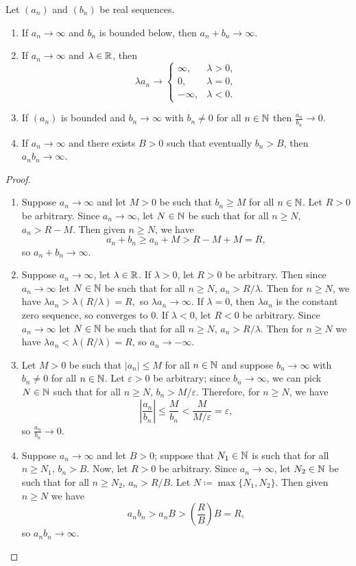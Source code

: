 \documentclass[../analysis1.tex]{subfiles}
\begin{document}
\begin{theorem}
\label{thm:divergenceresults1234}
    \begin{shaded*}
        Let $(a_n)$ and $(b_n)$ be real sequences.
        \begin{enumerate}
            \item[1.] If $a_n\to\infty$ and $b_n$ is bounded below, then $a_n+b_n\to\infty$.
            \item[2.] If $a_n\to\infty$ and $\lambda\in\mathbb{R}$, then $$\lambda a_n\to\begin{cases}\infty, & \lambda>0,\\ 0, & \lambda=0,\\ -\infty, & \lambda<0. \end{cases}$$
            \item[3.] If $(a_n)$ is bounded and $b_n\to\infty$ with $b_n\ne 0$ for all $n\in\mathbb{N}$ then $\frac{a_n}{b_n}\to 0$.
            \item[4.] If $a_n\to\infty$ and there exists $B>0$ such that eventually $b_n>B$, then $a_nb_n\to\infty$. 
        \end{enumerate}
    \end{shaded*}
\end{theorem}
\begin{proof}
    \begin{enumerate}
        \item[1.] Suppose $a_n\to\infty$ and let $M>0$ be such that $b_n\ge M$ for all $n\in\mathbb{N}$. Let $R>0$ be arbitrary. Since $a_n\to\infty$, let $N\in\mathbb{N}$ be such that for all $n\ge N$, $a_n>R-M$. Then given $n\ge N$, we have $$a_n+b_n\ge a_n+M>R-M+M=R,$$so $a_n+b_n\to\infty$.
        \item[2.] Suppose $a_n\to\infty$, let $\lambda\in\mathbb{R}$. If $\lambda>0$, let $R>0$ be arbitrary. Then since $a_n\to\infty$ let $N\in\mathbb{N}$ be such that for all $n\ge N$, $a_n>R/\lambda$. Then for $n\ge N$, we have $\lambda a_n>\lambda(R/\lambda)=R,$ so $\lambda a_n\to\infty$. If $\lambda=0$, then $\lambda a_n$ is the constant zero sequence, so converges to $0$. If $\lambda<0$, let $R<0$ be arbitrary. Since $a_n\to\infty$ let $N\in\mathbb{N}$ be such that for all $n\ge N$, $a_n>R/\lambda$. Then for $n\ge N$ we have $\lambda a_n<\lambda(R/\lambda)=R$, so $a_n\to -\infty$.
        \item[3.] Let $M>0$ be such that $|a_n|\le M$ for all $n\in\mathbb{N}$ and suppose $b_n\to\infty$ with $b_n\ne 0$ for all $n\in\mathbb{N}$. Let $\varepsilon>0$ be arbitrary; since $b_n\to\infty$, we can pick $N\in\mathbb{N}$ such that for all $n\ge N$, $b_n>M/\varepsilon$. Therefore, for $n\ge N$, we have $$\left|\frac{a_n}{b_n}\right|\le \frac{M}{b_n}<\frac{M}{M/\varepsilon}=\varepsilon,$$so $\frac{a_n}{b_n}\to 0$.
        \item[4.] Suppose $a_n\to\infty$ and let $B>0$; suppose that $N_1\in\mathbb{N}$ is such that for all $n\ge N_1$, $b_n>B$. Now, let $R>0$ be arbitrary. Since $a_n\to\infty$, let $N_2\in\mathbb{N}$ be such that for all $n\ge N_2$, $a_n>R/B$. Let $N\coloneqq\max\{N_1,N_2\}$. Then given $n\ge N$ we have $$a_nb_n>a_nB>\left(\frac{R}{B}\right)B=R,$$so $a_nb_n\to\infty$.\qedhere
    \end{enumerate}
\end{proof}
\end{document}
